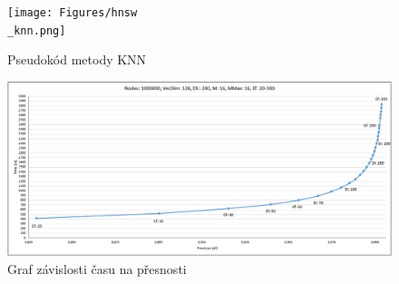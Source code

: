 \documentclass[czech,semestral,dept460,male,csharp,cpdeclaration]{diploma}
\begin{document}
		\begin{figure}
			\centering
			\texttt{[image: Figures/hnsw\\\_knn.png]}
			\caption{Pseudokód metody KNN}
			\label{hnsw_knn}
		\end{figure}
		
		\begin{figure}
			\centering
			\includegraphics[scale=0.5]{Figures/graf_hnsw.png}
			\caption{Graf závislosti času na přesnosti}
			\label{graf_hnsw}
		\end{figure}
		
\end{document}
